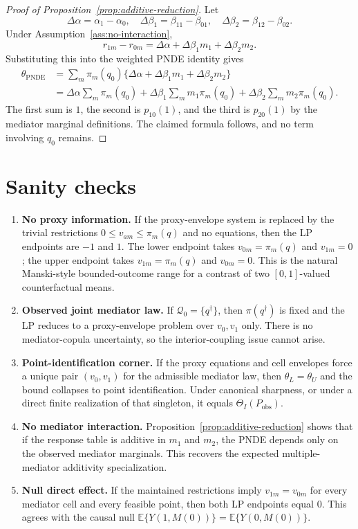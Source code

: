 \documentclass[11pt]{article}
\newcommand{\E}{\mathbb{E}}
\theoremstyle{definition}
\theoremstyle{plain}
\theoremstyle{remark}
\begin{document}
\begin{proof}[Proof of Proposition~\ref{prop:additive-reduction}]
Let
\[
  \Delta\alpha=\alpha_1-\alpha_0,\quad
  \Delta\beta_1=\beta_{11}-\beta_{01},\quad
  \Delta\beta_2=\beta_{12}-\beta_{02}.
\]
Under Assumption~\ref{ass:no-interaction},
\[
  r_{1m}-r_{0m}
  =
  \Delta\alpha+\Delta\beta_1 m_1+\Delta\beta_2 m_2.
\]
Substituting this into the weighted PNDE identity gives
\[
\begin{aligned}
  \theta_{\mathrm{PNDE}}
  &=
  \sum_m\pi_m(q_0)
    \{\Delta\alpha+\Delta\beta_1 m_1+\Delta\beta_2 m_2\}\\
  &=
  \Delta\alpha\sum_m\pi_m(q_0)
  +\Delta\beta_1\sum_m m_1\pi_m(q_0)
  +\Delta\beta_2\sum_m m_2\pi_m(q_0).
\end{aligned}
\]
The first sum is \(1\), the second is \(p_{10}(1)\), and the third is
\(p_{20}(1)\) by the mediator marginal definitions.  The claimed formula
follows, and no term involving \(q_0\) remains.
\end{proof}

\section{Sanity checks}
\begin{enumerate}[leftmargin=*]
\item \textbf{No proxy information.}  If the proxy-envelope system is replaced
by the trivial restrictions \(0\le v_{am}\le\pi_m(q)\) and no equations, then
the LP endpoints are \(-1\) and \(1\).  The lower endpoint takes
\(v_{0m}=\pi_m(q)\) and \(v_{1m}=0\); the upper endpoint takes
\(v_{1m}=\pi_m(q)\) and \(v_{0m}=0\).  This is the natural Manski-style
bounded-outcome range for a contrast of two \([0,1]\)-valued counterfactual
means.

\item \textbf{Observed joint mediator law.}  If
\(\mathcal Q_0=\{q^\dagger\}\), then \(\pi(q^\dagger)\) is fixed and the LP
reduces to a proxy-envelope problem over \(v_0,v_1\) only.  There is no
mediator-copula uncertainty, so the interior-coupling issue cannot arise.

\item \textbf{Point-identification corner.}  If the proxy equations and cell
envelopes force a unique pair \((v_0,v_1)\) for the admissible mediator law,
then \(\theta_L=\theta_U\) and the bound collapses to point identification.
Under canonical sharpness, or under a direct finite realization of that
singleton, it equals \(\Theta_I(P_{\mathrm{obs}})\).

\item \textbf{No mediator interaction.}  Proposition~\ref{prop:additive-reduction}
shows that if the response table is additive in \(m_1\) and \(m_2\), the PNDE
depends only on the observed mediator marginals.  This recovers the expected
multiple-mediator additivity specialization.

\item \textbf{Null direct effect.}  If the maintained restrictions imply
\(v_{1m}=v_{0m}\) for every mediator cell and every feasible point, then both
LP endpoints equal \(0\).  This agrees with the causal null
\(\E\{Y(1,M(0))\}=\E\{Y(0,M(0))\}\).
\end{enumerate}
\end{document}
